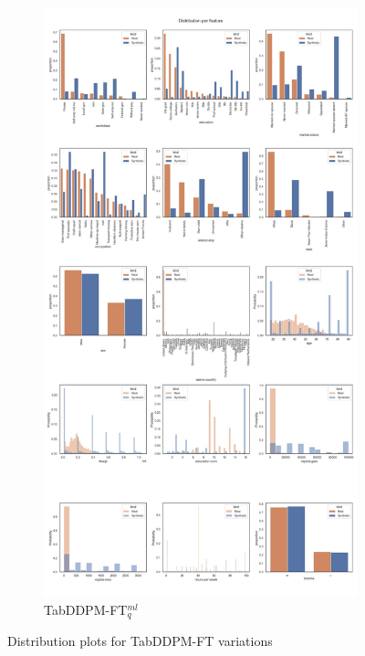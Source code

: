 \begin{landscape}
\begin{figure}[h]
		\hfill
		\begin{subfigure}{0.4\linewidth}
			\includegraphics[height=\textheight,width=\linewidth,keepaspectratio]{images/distributions_full/tab-ddpm-ft-simTune.jpg}
			\caption{TabDDPM-FT$^{ml}_q$}
		\end{subfigure}
		\caption[Distribution plots TabDDPM-FT Models]{Distribution plots for TabDDPM-FT variations}
		\label{fig_a:dist_5}
	\end{figure}
\end{landscape}



